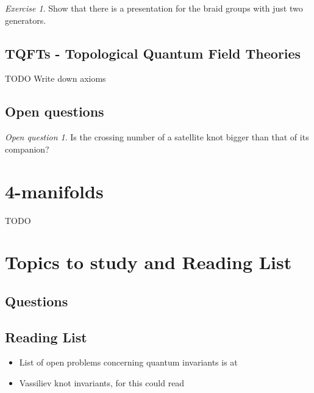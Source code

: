 \documentclass[nobib]{tufte-book} %
\theoremstyle{definition}
\theoremstyle{remark}
\newtheorem{openquestion}{Open question}
\newtheorem{exercise}{Exercise}
\begin{document}
\begin{exercise}
	Show that there is a presentation for the braid groups
	with just two generators.
\end{exercise}

\section{TQFTs - Topological Quantum Field Theories}

TODO Write down axioms


\section{Open questions}

\begin{openquestion}
	Is the crossing number of a satellite knot bigger than that of its companion?
\end{openquestion}





\chapter{4-manifolds}

TODO


\chapter{Topics to study and Reading List}

\section{Questions}



\section{Reading List}

\begin{itemize}
	\item List of open problems concerning quantum invariants
		is at
		\citep{ohtsuki2002problems}
	\item Vassiliev knot invariants, for this could read
		\citep{bar1995vassiliev}
\end{itemize}
\end{document}
